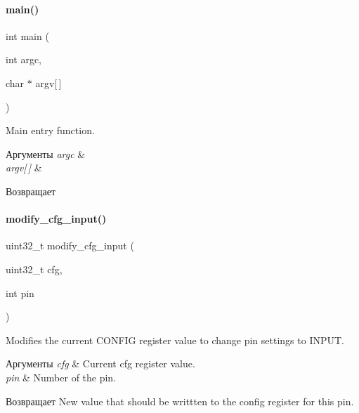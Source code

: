 \paragraph{main()}
{\footnotesize\ttfamily int main (\begin{DoxyParamCaption}\item[{int}]{argc,  }\item[{char $\ast$}]{argv[$\,$] }\end{DoxyParamCaption})}



Main entry function. 


\begin{DoxyParams}{Аргументы}
{\em argc} & \\
\hline
{\em argv\mbox{[}$\,$\mbox{]}} & \\
\hline
\end{DoxyParams}
\begin{DoxyReturn}{Возвращает}

\end{DoxyReturn}
\mbox{\label{rpp_8c_a549a008b0623d0cb7f1006d07a428a93}} 
\paragraph{modify\+\_\+cfg\+\_\+input()}
{\footnotesize\ttfamily uint32\+\_\+t modify\+\_\+cfg\+\_\+input (\begin{DoxyParamCaption}\item[{uint32\+\_\+t}]{cfg,  }\item[{int}]{pin }\end{DoxyParamCaption})}



Modifies the current C\+O\+N\+F\+IG register value to change pin settings to I\+N\+P\+UT. 


\begin{DoxyParams}{Аргументы}
{\em cfg} & Current cfg register value. \\
\hline
{\em pin} & Number of the pin.\\
\hline
\end{DoxyParams}
\begin{DoxyReturn}{Возвращает}
New value that should be writtten to the config register for this pin. 
\end{DoxyReturn}
\mbox{\label{rpp_8c_aaec858ef897365ec6491cc313442207d}} 
